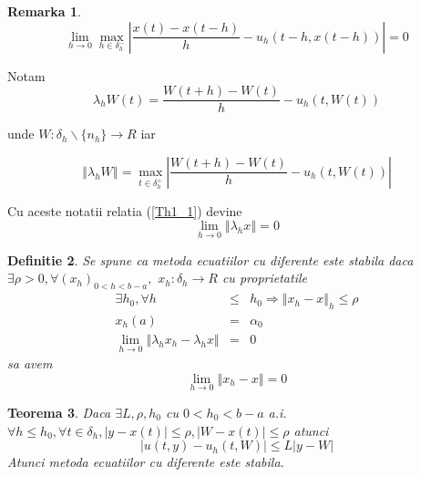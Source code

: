 \documentclass[a4paper,twoside]{book}
\newtheorem{theorem}{Teorema}
\newtheorem{definition}[theorem]{Definitie}
\newtheorem{remark}[theorem]{Remarka}
\begin{document}
\begin{remark}
\begin{equation*}
\lim_{h\rightarrow 0}\max_{h\in \delta _{h}^{-}}\left\vert \frac{x(t)-x(t-h)%
}{h}-u_{h}(t-h,x(t-h))\right\vert =0
\end{equation*}
\end{remark}

Notam%
\begin{equation*}
\lambda _{h}W(t)=\frac{W(t+h)-W(t)}{h}-u_{h}(t,W(t))
\end{equation*}

unde $W:\delta _{h}\backslash \{n_{h}\}\rightarrow R$ iar

\begin{equation*}
\left\Vert \lambda _{h}W\right\Vert =\max_{t\in \delta _{h}^{+}}\left\vert 
\frac{W(t+h)-W(t)}{h}-u_{h}(t,W(t))\right\vert
\end{equation*}

Cu aceste notatii relatia (\ref{Th1_1}) devine%
\begin{equation*}
\lim_{h\rightarrow 0}\left\Vert \lambda _{h}x\right\Vert =0
\end{equation*}

\begin{definition}
Se spune ca metoda ecuatiilor cu diferente este stabila daca $\exists \rho
>0,\forall \left( x_{h}\right) _{0<h<b-a},\,\,x_{h}:\delta _{h}\rightarrow R$
cu proprietatile 
\begin{eqnarray*}
\exists h_{0},\forall h &\leq &h_{0}\Rightarrow \left\Vert
x_{h}-x\right\Vert _{h}\leq \rho \\
x_{h}(a) &=&\alpha _{0} \\
\lim_{h\rightarrow 0}\left\Vert \lambda _{h}x_{h}-\lambda _{h}x\right\Vert
&=&0
\end{eqnarray*}%
sa avem%
\begin{equation*}
\lim_{h\rightarrow 0}\left\Vert x_{h}-x\right\Vert =0
\end{equation*}
\end{definition}

\begin{theorem}
Daca $\exists L,\rho ,h_{0}$ cu $0<h_{0}<b-a$ a.i. $\forall h\leq
h_{0},\forall t\in \delta _{h},\left\vert y-x(t)\right\vert \leq \rho
,\left\vert W-x(t)\right\vert \leq \rho $ atunci 
\begin{equation}
\left\vert u(t,y)-u_{h}(t,W)\right\vert \leq L\left\vert y-W\right\vert
\label{Th2_1}
\end{equation}%
Atunci metoda ecuatiilor cu diferente este stabila.
\end{theorem}
\end{document}
